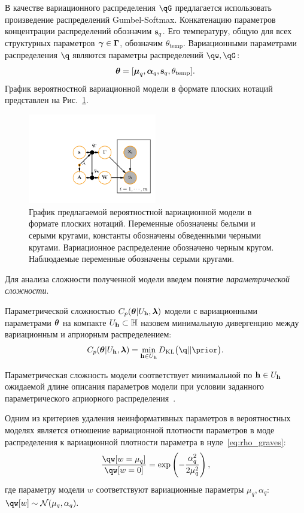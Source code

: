 В качестве вариационного распределения $\qG$ предлагается использовать произведение распределений Gumbel-Softmax. Конкатенацию параметров концентрации распределений обозначим $\mathbf{s}_q$. Его температуру, общую для всех структурных параметров $\boldsymbol{\gamma} \in \boldsymbol{\Gamma}$, обозначим $\theta_\text{temp}$.
Вариационными параметрами распределения $\q$ являются параметры распределений $\qw, \qG$:
\[\boldsymbol{\theta} =[\boldsymbol{\mu}_q, \boldsymbol{\alpha}_q,\mathbf{s}_q, \theta_\text{temp}]. 
\]
График вероятностной вариационной модели в формате плоских нотаций представлен на Рис.~\ref{fig:plate_qprob}.
\begin{figure}
\centering
   \includegraphics[width=0.5\textwidth]{plots/notebooks/plate.pdf}
\caption{График предлагаемой вероятностной вариационной модели в формате плоских нотаций. Переменные обозначены белыми и серыми кругами, константы обозначены обведенными черными кругами. Вариационное распределение обозначено черным кругом. Наблюдаемые переменные обозначены серыми кругами.}
\label{fig:plate_qprob}
\end{figure}
Для анализа сложности полученной модели введем понятие \textit{параметрической сложности}. 
\begin{defin} 
Параметрической сложностью  $C_p(\boldsymbol{\theta}|U_{\mathbf{h}}, \boldsymbol{\lambda})$ модели с вариационными параметрами $\boldsymbol{\theta}$ на компакте $U_{\mathbf{h}} \subset \mathbb{H}$ назовем минимальную дивергенцию между вариационным и априорным распределением:
\[
C_p(\teta|\Uh, \lam) = \min_{\h \in \Uh} \KL{\q}{\prior}.
\]
\end{defin}
Параметрическая сложность модели соответствует минимальной по $\mathbf{h} \in U_{\mathbf{h}}$ ожидаемой длине описания параметров модели при условии заданного параметрического априорного распределения~\cite{hinton_mdl}.

Одним из критериев удаления неинформативных параметров в вероятностных моделях является отношение вариационной плотности параметров в моде распределения к вариационной плотности параметра в нуле~\eqref{eq:rho_graves}:
\[\frac{\qw[w=\mu_q]}{\qw[w=0]}= \text{exp}\left(-\frac{\alpha_q^2}{2\mu_q^2}\right),
\]
где параметру модели $w$ соответствуют вариационные параметры $\mu_q, \alpha_q$: $\qw[w] \sim \mathcal{N}(\mu_q, \alpha_q).$


